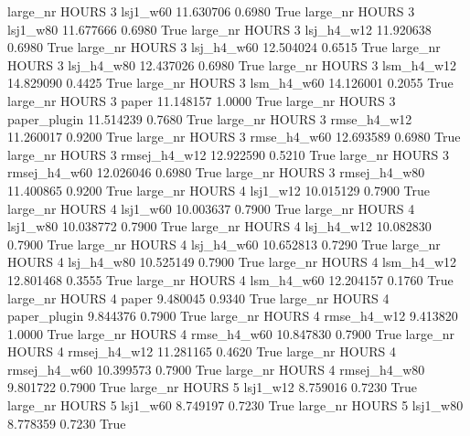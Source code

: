   large_nr    HOURS                 3     lsj1_w60   11.630706      0.6980    True
  large_nr    HOURS                 3     lsj1_w80   11.677666      0.6980    True
  large_nr    HOURS                 3   lsj_h4_w12   11.920638      0.6980    True
  large_nr    HOURS                 3   lsj_h4_w60   12.504024      0.6515    True
  large_nr    HOURS                 3   lsj_h4_w80   12.437026      0.6980    True
  large_nr    HOURS                 3   lsm_h4_w12   14.829090      0.4425    True
  large_nr    HOURS                 3   lsm_h4_w60   14.126001      0.2055    True
  large_nr    HOURS                 3        paper   11.148157      1.0000    True
  large_nr    HOURS                 3 paper_plugin   11.514239      0.7680    True
  large_nr    HOURS                 3  rmse_h4_w12   11.260017      0.9200    True
  large_nr    HOURS                 3  rmse_h4_w60   12.693589      0.6980    True
  large_nr    HOURS                 3 rmsej_h4_w12   12.922590      0.5210    True
  large_nr    HOURS                 3 rmsej_h4_w60   12.026046      0.6980    True
  large_nr    HOURS                 3 rmsej_h4_w80   11.400865      0.9200    True
  large_nr    HOURS                 4     lsj1_w12   10.015129      0.7900    True
  large_nr    HOURS                 4     lsj1_w60   10.003637      0.7900    True
  large_nr    HOURS                 4     lsj1_w80   10.038772      0.7900    True
  large_nr    HOURS                 4   lsj_h4_w12   10.082830      0.7900    True
  large_nr    HOURS                 4   lsj_h4_w60   10.652813      0.7290    True
  large_nr    HOURS                 4   lsj_h4_w80   10.525149      0.7900    True
  large_nr    HOURS                 4   lsm_h4_w12   12.801468      0.3555    True
  large_nr    HOURS                 4   lsm_h4_w60   12.204157      0.1760    True
  large_nr    HOURS                 4        paper    9.480045      0.9340    True
  large_nr    HOURS                 4 paper_plugin    9.844376      0.7900    True
  large_nr    HOURS                 4  rmse_h4_w12    9.413820      1.0000    True
  large_nr    HOURS                 4  rmse_h4_w60   10.847830      0.7900    True
  large_nr    HOURS                 4 rmsej_h4_w12   11.281165      0.4620    True
  large_nr    HOURS                 4 rmsej_h4_w60   10.399573      0.7900    True
  large_nr    HOURS                 4 rmsej_h4_w80    9.801722      0.7900    True
  large_nr    HOURS                 5     lsj1_w12    8.759016      0.7230    True
  large_nr    HOURS                 5     lsj1_w60    8.749197      0.7230    True
  large_nr    HOURS                 5     lsj1_w80    8.778359      0.7230    True
